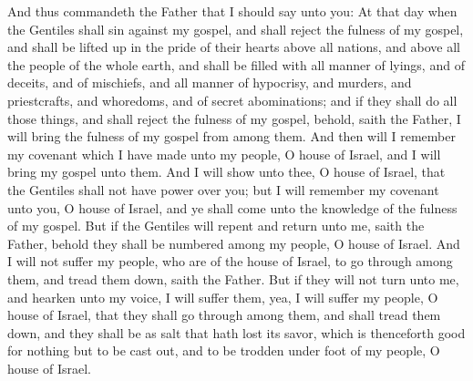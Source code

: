 And thus commandeth the Father that I should say unto you: At that day when the Gentiles shall sin against my gospel, and shall reject the fulness of my gospel, and shall be lifted up in the pride of their hearts above all nations, and above all the people of the whole earth, and shall be filled with all manner of lyings, and of deceits, and of mischiefs, and all manner of hypocrisy, and murders, and priestcrafts, and whoredoms, and of secret abominations; and if they shall do all those things, and shall reject the fulness of my gospel, behold, saith the Father, I will bring the fulness of my gospel from among them.
\bverse \iffalse And then will I remember my covenant which I have made unto my people, O house of Israel, and I will bring my gospel unto them. \fi
And then will I remember my covenant which I have made unto my people, O house of Israel, and I will bring my gospel unto them.
\bverse \iffalse And I will show unto thee, O house of Israel, that the Gentiles shall not have power over you; but I will remember my covenant unto you, O house of Israel, and ye shall come unto the knowledge of the fulness of my gospel. \fi
And I will show unto thee, O house of Israel, that the Gentiles shall not have power over you; but I will remember my covenant unto you, O house of Israel, and ye shall come unto the knowledge of the fulness of my gospel.
\bverse \iffalse But if the Gentiles will repent and return unto me, saith the Father, behold they shall be numbered among my people, O house of Israel. \fi
But if the Gentiles will repent and return unto me, saith the Father, behold they shall be numbered among my people, O house of Israel.
\bverse \iffalse And I will not suffer my people, who are of the house of Israel, to go through among them, and tread them down, saith the Father. \fi
And I will not suffer my people, who are of the house of Israel, to go through among them, and tread them down, saith the Father.
\bverse \iffalse But if they will not turn unto me, and hearken unto my voice, I will suffer them, yea, I will suffer my people, O house of Israel, that they shall go through among them, and shall tread them down, and they shall be as salt that hath lost its savor, which is thenceforth good for nothing but to be cast out, and to be trodden under foot of my people, O house of Israel. \fi
But if they will not turn unto me, and hearken unto my voice, I will suffer them, yea, I will suffer my people, O house of Israel, that they shall go through among them, and shall tread them down, and they shall be as salt that hath lost its savor, which is thenceforth good for nothing but to be cast out, and to be trodden under foot of my people, O house of Israel.
